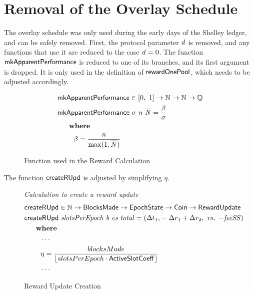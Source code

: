 \newcommand{\createRUpd}[4]{\fun{createRUpd}~\var{#1}~\var{#2}~\var{#3}~\var{#4}}
\newcommand{\mkApparentPerformance}[3]{\fun{mkApparentPerformance}~{#1}~\var{#2}~\var{#3}}
\newcommand{\Q}{\ensuremath{\mathbb{Q}}}
\newcommand{\ActiveSlotCoeff}{\mathsf{ActiveSlotCoeff}}
\newcommand{\EpochState}{\type{EpochState}}
\newcommand{\BlocksMade}{\type{BlocksMade}}
\newcommand{\RewardUpdate}{\type{RewardUpdate}}
\newcommand{\PrtclState}{\type{PrtclState}}
\newcommand{\PrtclEnv}{\type{PrtclEnv}}
\newcommand{\PoolDistr}{\type{PoolDistr}}
\newcommand{\bheader}[1]{\fun{bheader}~\var{#1}}

\section{Removal of the Overlay Schedule}

The overlay schedule was only used during the early days of the Shelley ledger, and can be safely removed. First, the protocol parameter $\mathit{d}$ is removed, and any functions that use it are reduced to the case $\mathit{d} = 0$. The function $\mathsf{mkApparentPerformance}$ is reduced to one of its branches, and its first argument is dropped. It is only used in the definition of $\mathsf{rewardOnePool}$, which needs to be adjusted accordingly.

\begin{figure}[htb]
    \begin{align*}
      & \fun{mkApparentPerformance} \in \unitInterval \to \N \to \N \to \Q \\
      & \mkApparentPerformance{\sigma}{n}{\overline{N}} = \frac{\beta}{\sigma} \\
      & ~~~\where \\
      & ~~~~~~~\beta = \frac{n}{\max(1, \overline{N})} \\
  \end{align*}
  \caption{Function used in the Reward Calculation}
  \label{fig:functions:rewards}
\end{figure}

The function $\mathsf{createRUpd}$ is adjusted by simplifying $\eta$.

\begin{figure}[htb]
  \emph{Calculation to create a reward update}
  \begin{align*}
    & \fun{createRUpd} \in \N \to \BlocksMade \to \EpochState \to \Coin \to \RewardUpdate \\
    & \createRUpd{slotsPerEpoch}{b}{es}{total} = \left(
      \Delta t_1,-~\Delta r_1+\Delta r_2,~\var{rs},~-\var{feeSS}\right) \\
    & ~~~\where \\
    & ~~~~~~~\dotsb \\
    & ~~~~~~~\eta =
        \frac{blocksMade}{\floor{{slotsPerEpoch} \cdot \ActiveSlotCoeff}} \\
    & ~~~~~~~\dotsb
  \end{align*}

  \caption{Reward Update Creation}
  \label{fig:functions:reward-update-creation}
\end{figure}

